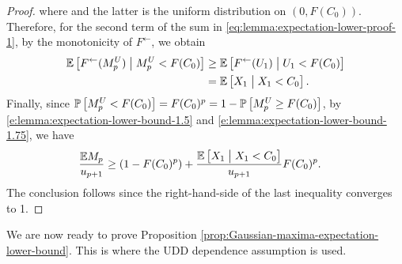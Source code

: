 \begin{proof}
where and the latter is the uniform distribution on $(0,F(C_0))$.
Therefore, for the second term of the sum in \eqref{eq:lemma:expectation-lower-proof-1}, by the 
monotonicity of $F^{\leftarrow}$, we obtain
\begin{align} \label{e:lemma:expectation-lower-bound-1.75}
    \E\left[F^{\leftarrow}(M^{U}_p)\;\big|\;M^{U}_p < F(C_0)\right] 
        &\ge \E\left[F^{\leftarrow}(U_1)\;\big|\;U_1 < F(C_0)\right] \nonumber \\
        &= \E\left[X_1\;\big|\;X_1 < C_0\right].
\end{align}
Finally, since $\P\left[M^{U}_p < F(C_0)\right] = F(C_0)^p = 1 - \P\left[M^{U}_p \ge F(C_0)\right]$, by \eqref{e:lemma:expectation-lower-bound-1.5} and \eqref{e:lemma:expectation-lower-bound-1.75}, we have %
\begin{align*}
    \frac{\E M_p}{u_{p+1}} 
        &\ge \left(1 - F(C_0)^p\right) + \frac{\E\left[X_1\;\big|\;X_1 < C_0\right]}{u_{p+1}} F(C_0)^p.
\end{align*}
The conclusion follows since the right-hand-side of the last inequality converges to 1.
\end{proof}


We are now ready to prove Proposition \ref{prop:Gaussian-maxima-expectation-lower-bound}. 
This is where the UDD dependence assumption is used.

